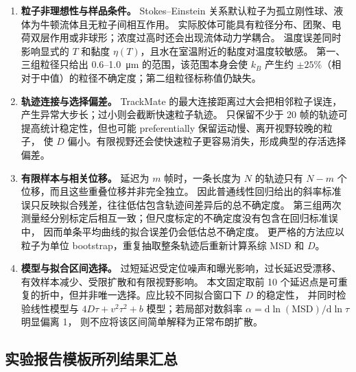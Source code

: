 \documentclass[11pt]{article}
\begin{document}
\begin{enumerate}
    \item \textbf{粒子非理想性与样品条件。}
    Stokes--Einstein 关系默认粒子为孤立刚性球、液体为牛顿流体且无粒子间相互作用。
    实际胶体可能具有粒径分布、团聚、电荷双层作用或非球形；浓度过高时还会出现流体动力学耦合。
    温度误差同时影响显式的 $T$ 和黏度 $\eta(T)$，且水在室温附近的黏度对温度较敏感。
    第一、三组粒径只给出 $0.6$--\SI{1.0}{\micro m} 的范围，该范围本身会使
    $k_B$ 产生约 $\pm25\%$（相对于中值）的粒径不确定度；第二组粒径标称值仍缺失。

    \item \textbf{轨迹连接与选择偏差。}
    TrackMate 的最大连接距离过大会把相邻粒子误连，产生异常大步长；过小则会截断快速粒子轨迹。
    只保留不少于 20 帧的轨迹可提高统计稳定性，但也可能 preferentially 保留运动慢、离开视野较晚的粒子，
    使 $D$ 偏小。有限视野还会使快速粒子更容易消失，形成典型的存活选择偏差。

    \item \textbf{有限样本与相关位移。}
    延迟为 $m$ 帧时，一条长度为 $N$ 的轨迹只有 $N-m$ 个位移，而且这些重叠位移并非完全独立。
    因此普通线性回归给出的斜率标准误只反映拟合残差，往往低估包含轨迹间差异后的总不确定度。
    第三组两次测量经分别标定后相互一致；但尺度标定的不确定度没有包含在回归标准误中，
    因而单条平均曲线的拟合误差仍会低估总不确定度。
    更严格的方法应以粒子为单位 bootstrap，重复抽取整条轨迹后重新计算系综 MSD 和 $D$。

    \item \textbf{模型与拟合区间选择。}
    过短延迟受定位噪声和曝光影响，过长延迟受漂移、有效样本减少、受限扩散和有限视野影响。
    本文固定取前 10 个延迟点是可重复的折中，但并非唯一选择。应比较不同拟合窗口下 $D$ 的稳定性，
    并同时检验线性模型与 $4D\tau+v^2\tau^2+b$ 模型；若局部对数斜率
    $\alpha=\mathrm d\ln(\mathrm{MSD})/\mathrm d\ln\tau$ 明显偏离 1，
    则不应将该区间简单解释为正常布朗扩散。
\end{enumerate}

\subsection{实验报告模板所列结果汇总}
\end{document}
